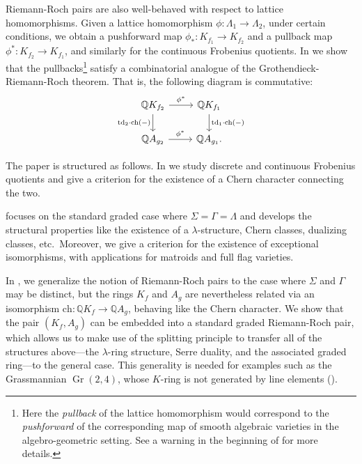 \documentclass[oneside]{amsart}
\theoremstyle{plain}
\theoremstyle{definition}
\newcommand{\Q}{{\mathbb{Q}}}
\newcommand{\Gr}{\operatorname{Gr}}
\newcommand{\ch}{{\mathrm{ch}}}
\newcommand{\td}{{\mathrm{td}}}
\begin{document}
Riemann-Roch pairs are also well-behaved with respect to lattice homomorphisms. Given a lattice homomorphism $\phi: \Lambda_1 \to \Lambda_2$, under certain conditions, we obtain a pushforward map $\phi_*: K_{f_1} \to K_{f_2}$ and a pullback map $\phi^*: K_{f_2} \to K_{f_1}$, and similarly for the continuous Frobenius quotients. In  we show that the pullbacks\footnote{Here the \emph{pullback} of the lattice homomorphism would correspond to the \emph{pushforward} of the corresponding map of smooth algebraic varieties in the algebro-geometric setting. See a warning in the beginning of  for more details.} satisfy a combinatorial analogue of the Grothendieck-Riemann-Roch theorem. That is, the following diagram is commutative:
\[
\begin{tikzcd}
\Q K_{f_2} \arrow[d, "\td_2\cdot \ch(-)"'] \arrow[r, "\phi^*"] & \Q K_{f_1} \arrow[d, "\td_1\cdot\ch(-)"] \\
\Q A_{g_2} \arrow[r, "\phi^*"]                          & \Q A_{g_1}.                    
\end{tikzcd}
\]


\medskip

The paper is structured as follows. In  we study discrete and continuous Frobenius quotients and give a criterion for the existence of a Chern character connecting the two.

 focuses on the standard graded case where $\Sigma=\Gamma=\Lambda$ and develops the structural properties like the existence of a $\lambda$-structure, Chern classes, dualizing classes, etc.\ Moreover, we give a criterion for the existence of exceptional isomorphisms, with applications for matroids and full flag varieties.

In , we generalize the notion of Riemann-Roch pairs to the case where $\Sigma$ and $\Gamma$ may be distinct, but the rings $K_f$ and $A_g$ are nevertheless related via an isomorphism $\ch: \Q K_f \to \Q A_g$, behaving like the Chern character. We show that the pair $(K_f, A_g)$ can be embedded into a standard graded Riemann-Roch pair, which allows us to make use of the splitting principle to transfer all of the structures above---the $\lambda$-ring structure, Serre duality, and the associated graded ring---to the general case. This generality is needed for examples such as the Grassmannian $\Gr(2,4)$, whose $K$-ring is not generated by line elements ().
\end{document}
